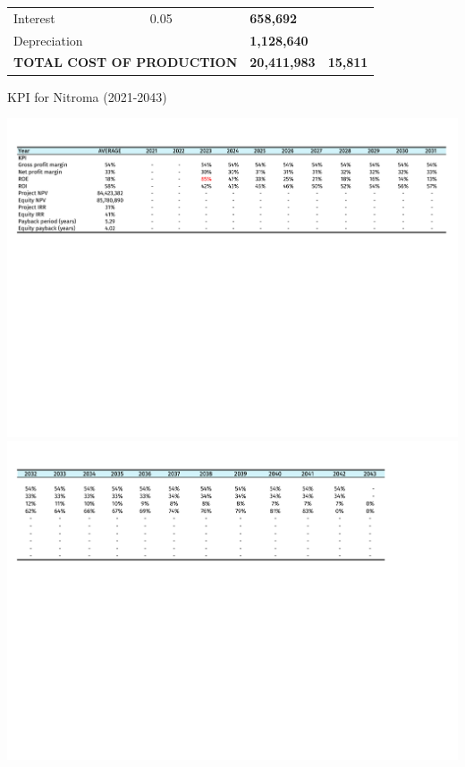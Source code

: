 \begin{table}[H]
\begin{tabular}{@{}llllll@{}}
Interest                      & 0.05                  &                                       &                           & \textbf{658,692}           &                      \\
Depreciation                  &                       &                                       &                           & \textbf{1,128,640}         &                      \\ \cline{5-6} 
\multicolumn{4}{l}{\textbf{TOTAL COST OF PRODUCTION}}                                                                     & \textbf{20,411,983}        & \textbf{15,811}     
\end{tabular}
\end{table}

\begin{landscape}
\begin{table}[H]
\label{tab:KPI}
  \caption{KPI for Nitroma (2021-2043)}
\includegraphics[clip, trim=0cm 12cm 0cm 1cm, width=\linewidth]{chapters/Z-support/attachments/KPI1.pdf} \\

\includegraphics[clip, trim=0cm 12cm 0cm 1cm, width=\linewidth]{chapters/Z-support/attachments/KPI2.pdf}
\end{table}
\end{landscape}

